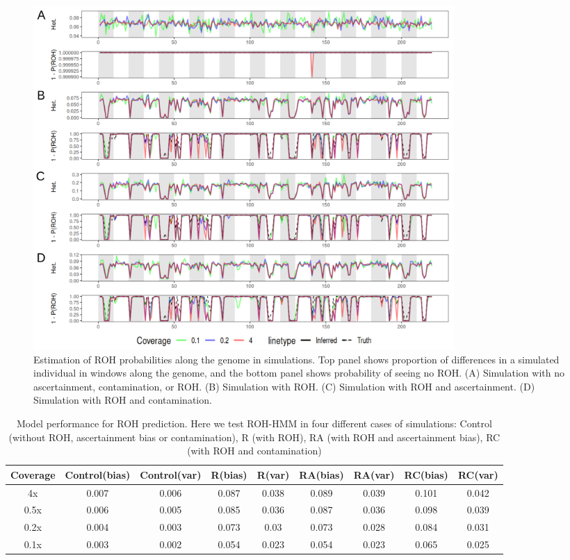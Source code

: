 \documentclass[12pt, letterpaper]{article}
\begin{document}
\begin{figure}[h!]
    \includegraphics[width=16cm]{plots/inkscape_finalImg/ROHplot_review.png}
    \centering
    \caption{Estimation of ROH probabilities along the genome in simulations. Top panel shows proportion of differences in a simulated individual in windows along the genome, and the bottom panel shows probability of seeing no ROH. (A) Simulation with no ascertainment, contamination, or ROH. (B) Simulation with ROH. (C) Simulation with ROH and ascertainment. (D) Simulation with ROH and contamination.}
    \label{fig2:ROH}
\end{figure}

\begin{table}[h!]
\caption{\label{tab:Table 2}Model performance for ROH prediction. Here we test ROH-HMM in four different cases of simulations: Control (without ROH, ascertainment bias or contamination), R (with ROH), RA (with ROH and ascertainment bias), RC (with ROH and contamination)}
\begin{tabular}{|c|c|c|c|c|c|c|c|c|}
    \hline
    Coverage & Control(bias) & Control(var) & R(bias) & R(var) & RA(bias) & RA(var) & RC(bias) & RC(var)\\
    \hline
    4x & 0.007 & 0.006 & 0.087 & 0.038 & 0.089 & 0.039 & 0.101 & 0.042\\
    \hline
    0.5x & 0.006 & 0.005 & 0.085 & 0.036 & 0.087 & 0.036 & 0.098 & 0.039\\
    \hline
    0.2x & 0.004 & 0.003 & 0.073 & 0.03 & 0.073 & 0.028 & 0.084 & 0.031\\
    \hline
    0.1x & 0.003 & 0.002 & 0.054 & 0.023 & 0.054 & 0.023 & 0.065 & 0.025\\
    \hline
\end{tabular}
\label{table1}
\end{table}
\end{document}
